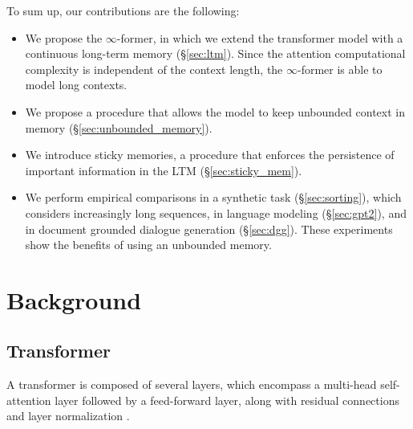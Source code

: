 \documentclass[11pt]{article}
\begin{document}
To sum up, our contributions are the following:
 \begin{itemize}
     \item We propose the \mbox{$\infty$-former}, in which we extend the transformer model with a continuous long-term memory (\S \ref{sec:ltm}). Since the attention computational complexity is independent of the context length, the \mbox{$\infty$-former} is able to model long contexts.
     \item We propose a procedure that allows the model to keep unbounded context in memory (\S \ref{sec:unbounded_memory}).
    \item We introduce sticky memories, a procedure that enforces the persistence of important information in the LTM (\S \ref{sec:sticky_mem}). 
     \item We perform empirical comparisons in a synthetic task (\S \ref{sec:sorting}), which considers increasingly long sequences, in language modeling (\S \ref{sec:gpt2}), and in document grounded dialogue generation (\S \ref{sec:dgg}). These experiments show the benefits of using an unbounded memory. 
 \end{itemize}
 

\section{Background}

\subsection{Transformer}
\label{sec:transformer}
A transformer \cite{vaswani2017attention} is composed of several layers, which encompass a multi-head self-attention layer followed by a feed-forward layer, along with residual connections \cite{he2016deep} and layer normalization \cite{ba2016layer}.
\end{document}
